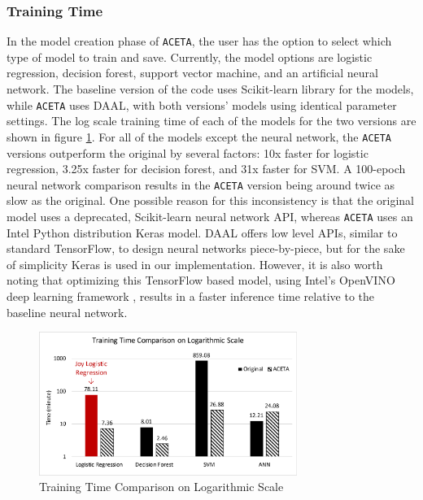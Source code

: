\subsubsection{Training Time}
In the model creation phase of \texttt{ACETA}, the user has the option to select which type of model to train and save. Currently, the model options are logistic regression, decision forest, support vector machine, and an artificial neural network. The baseline version of the code uses Scikit-learn library for the models, while \texttt{ACETA} uses DAAL, with both versions' models using identical parameter settings. The log scale training time of each of the models for the two versions are shown in figure \ref{figure:training-time}. For all of the models except the neural network, the \texttt{ACETA} versions outperform the original by several factors: 10x faster for logistic regression, 3.25x faster for decision forest, and 31x faster for SVM. A 100-epoch neural network comparison results in the \texttt{ACETA} version being around twice as slow as the original. One possible reason for this inconsistency is that the original model uses a deprecated, Scikit-learn neural network API, whereas \texttt{ACETA} uses an Intel Python distribution Keras \cite{keras} model. DAAL offers low level APIs, similar to standard TensorFlow, to design neural networks piece-by-piece, but for the sake of simplicity Keras is used in our implementation. However, it is also worth noting that optimizing this TensorFlow based model, using Intel's OpenVINO deep learning framework \cite{openvino}, results in a faster inference time relative to the baseline neural network.

\begin{figure}[h!]
	\centering
	\includegraphics[width=3.3in]{./fig/training-log.eps}
	\caption{Training Time Comparison on Logarithmic Scale}
	\label{figure:training-time}
\end{figure}


